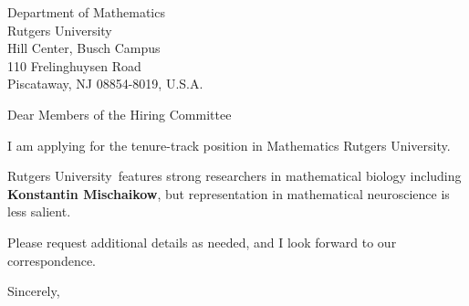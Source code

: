 




	
	
	\def\School{Rutgers University}
	
	\begin{letter}
		{Department of Mathematics\\
			Rutgers University\\
			Hill Center, Busch Campus\\
			110 Frelinghuysen Road\\
			Piscataway, NJ 08854-8019, U.S.A.
			
		}
		
		\opening{Dear Members of the Hiring Committee}
		
		
		I am applying for the tenure-track position in Mathematics \School. 
		
		
		
		\School~features strong researchers in mathematical biology including \textbf{Konstantin Mischaikow}, but representation in mathematical neuroscience is less salient. 
		
		
		
		
		
		Please request additional details as needed, and I look forward to our correspondence.
		
		\closing{Sincerely,}
	\end{letter}
